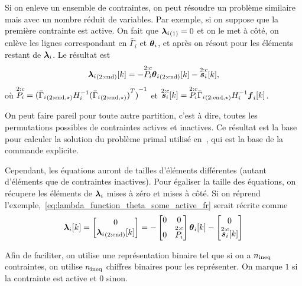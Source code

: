 \documentclass[../main.tex]{subfiles}
\begin{document}
Si on enleve un ensemble de contraintes, on peut résoudre un problème similaire mais avec un nombre réduit de variables.
Par exemple, si on suppose que la première contrainte est active.
On fait que $\elem[1]{\lambdai}=0$ et on le met à côté, on enlève les lignes correspondant en $\bar{\Gamma}_{i}$ et $\thetai$, et après on résout pour les éléments restant de $\lambdai$. Le résultat est
\begin{equation}
  \label{eq:lambda_function_theta_some_active_fr}
  \elem[2:\elemend]{\lambdai}[k]=-\Plinineqnonzero[2:c] \elem[2:\elemend]{\thetai}[k]-\sikineqnonzero[2:c],
\end{equation}
où $\Plinineqnonzero[2:c]={(\linearcoefiineqnonzero[2:\elemend,\star])}^{-1}$ et $\sikineqnonzero[2:c]=\Plinineqnonzero[2:c]\elem[2:\elemend,\star]{\bar{\Gamma}_{i}}H_{i}^{-1}\vec{f}_{i}[k]$.

On peut faire pareil pour toute autre partition, c'est à dire, toutes les permutations possibles de contraintes actives et inactives.
Ce résultat est la base pour calculer la solution du problème primal utilisé en~\cite{BemporadEtAl2002,AlessioBemporad2009}, qui est la base de la commande \mpc{} explicite.

Cependant, les équations auront de tailles d'éléments différentes (autant d'éléments que de contraintes inactives).
Pour égaliser la taille des équations, on récupere les éléments de $\lambdai$ mises à zéro et mises à côté.
Si on réprend l'exemple,~\eqref{eq:lambda_function_theta_some_active_fr} serait récrite comme
\begin{equation}
  \label{eq:lambda_function_theta_some_active_same_size_fr}
  \lambdaik=
  \left[
    \begin{matrix}
      0\\
      \elem[2:\elemend]{\lambdai}[k]
    \end{matrix}
  \right]
  =
  -
  \left[
    \begin{matrix}
      0&0\\
      0&\Plinineqnonzero[2:c]
    \end{matrix}
  \right]
  \thetaik
  -
  \left[
    \begin{matrix}
      0\\
      \sikineqnonzero[2:c]
    \end{matrix}
  \right]
\end{equation}

Afin de faciliter, on utilise une représentation binaire tel que si on a $\nineq$ contraintes, on utilise $\nineq$ chiffres binaires pour les représenter.
On marque $1$ si la contrainte est active et $0$ sinon.
\end{document}
